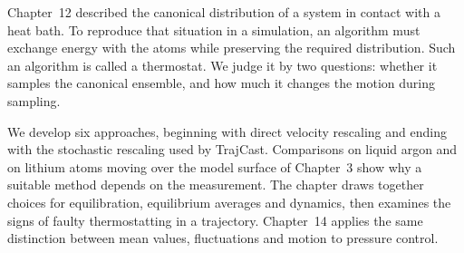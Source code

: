 Chapter~12 described the canonical distribution of a system in contact
with a heat bath. To reproduce that situation in a simulation, an
algorithm must exchange energy with the atoms while preserving the
required distribution. Such an algorithm is called a thermostat. We
judge it by two questions: whether it samples the canonical ensemble,
and how much it changes the motion during sampling.

We develop six approaches, beginning with direct velocity rescaling and
ending with the stochastic rescaling used by TrajCast. Comparisons on
liquid argon and on lithium atoms moving over the model surface of
Chapter~3 show why a suitable method depends on the measurement. The
chapter draws together choices for equilibration, equilibrium averages
and dynamics, then examines the signs of faulty thermostatting in a
trajectory. Chapter~14 applies the same distinction between mean values,
fluctuations and motion to pressure control.

